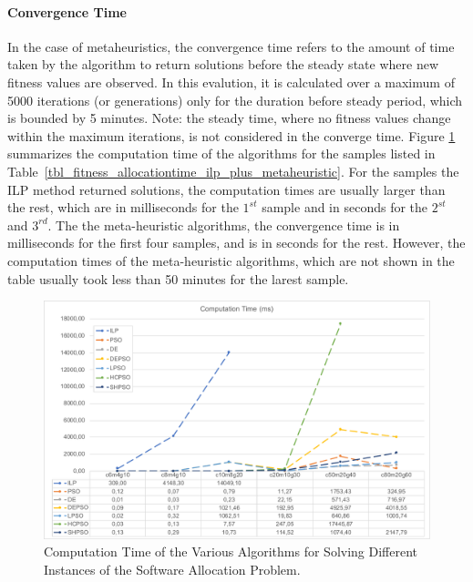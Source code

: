 \paragraph{Convergence Time} In the case of metaheuristics, the convergence time refers to the amount of time taken by the algorithm to return solutions before the steady state where new fitness values are observed. In this evalution, it is calculated over a maximum of 5000 iterations (or generations) only for the duration before steady period, which is bounded by 5 minutes. Note: the steady time, where no fitness values change within the maximum iterations, is not considered in the converge time.  Figure \ref{fig_allocationtime_ilp_metaheuristic} summarizes the computation time of the algorithms for the samples listed in Table~\ref{tbl_fitness_allocationtime_ilp_plus_metaheuristic}. For the samples the ILP method returned solutions, the computation times are usually larger than the rest, which are in milliseconds for the $1^{st}$ sample and in seconds for the $2^{st}$  and $3^{rd}$.  The the meta-heuristic algorithms, the convergence time is in milliseconds for the first four samples, and is in seconds for the rest. However, the computation times of the meta-heuristic algorithms, which are not shown in the table usually took less than 50 minutes for the larest sample.
\begin{figure}[h!]
\centering
\includegraphics[width=1\linewidth]{img/time_summary.pdf}
\caption{Computation Time of the Various Algorithms for Solving Different Instances of the Software Allocation Problem.}
\label{fig_allocationtime_ilp_metaheuristic}\vspace{-0.4cm}
\end{figure}
%
